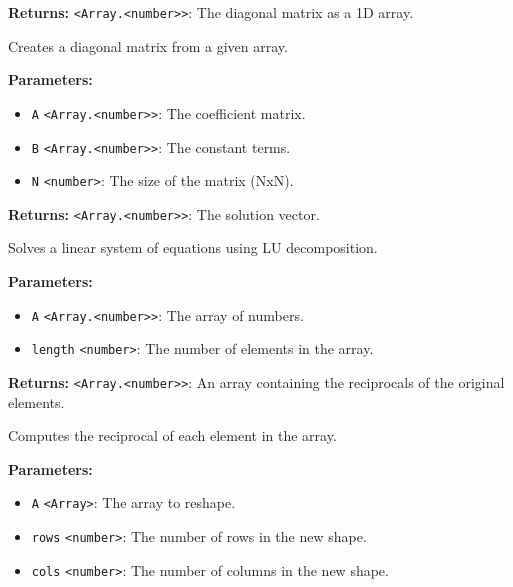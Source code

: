 \documentclass[12pt,a4paper]{article}
\begin{document}
\noindent \textbf{Returns:} \texttt{<Array.<number>>}: The diagonal matrix as a 1D array.

\noindent Creates a diagonal matrix from a given array.

\vspace{5mm}
\noindent {}


\noindent \textbf{Parameters:}
\begin{itemize}
  \item \texttt{A} \texttt{<Array.<number>>}: The coefficient matrix.
  \item \texttt{B} \texttt{<Array.<number>>}: The constant terms.
  \item \texttt{N} \texttt{<number>}: The size of the matrix (NxN).
\end{itemize}

\noindent \textbf{Returns:} \texttt{<Array.<number>>}: The solution vector.

\noindent Solves a linear system of equations using LU decomposition.

\vspace{5mm}
\noindent {}


\noindent \textbf{Parameters:}
\begin{itemize}
  \item \texttt{A} \texttt{<Array.<number>>}: The array of numbers.
  \item \texttt{length} \texttt{<number>}: The number of elements in the array.
\end{itemize}

\noindent \textbf{Returns:} \texttt{<Array.<number>>}: An array containing the reciprocals of the original elements.

\noindent Computes the reciprocal of each element in the array.

\vspace{5mm}
\noindent {}


\noindent \textbf{Parameters:}
\begin{itemize}
  \item \texttt{A} \texttt{<Array>}: The array to reshape.
  \item \texttt{rows} \texttt{<number>}: The number of rows in the new shape.
  \item \texttt{cols} \texttt{<number>}: The number of columns in the new shape.
\end{itemize}
\end{document}
